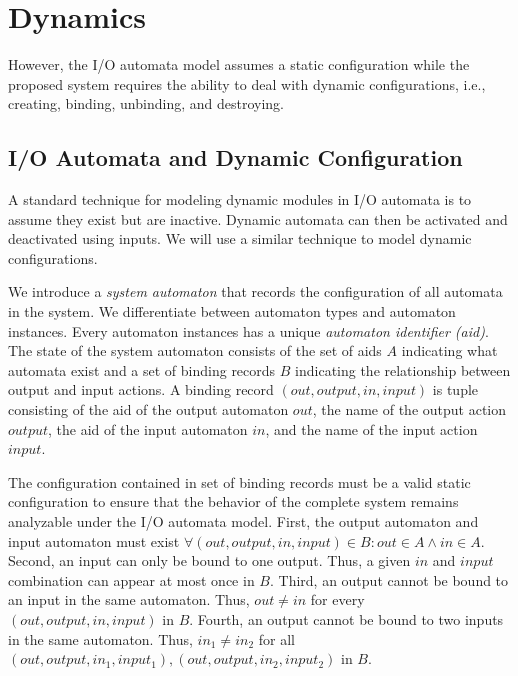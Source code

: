 \section{Dynamics}

However, the I/O automata model assumes a static configuration while the proposed system requires the ability to deal with dynamic configurations, i.e., creating, binding, unbinding, and destroying.

\subsection{I/O Automata and Dynamic Configuration}

A standard technique for modeling dynamic modules in I/O automata is to assume they exist but are inactive.
Dynamic automata can then be activated and deactivated using inputs.
We will use a similar technique to model dynamic configurations.

We introduce a \emph{system automaton} that records the configuration of all automata in the system.
We differentiate between automaton types and automaton instances.
Every automaton instances has a unique \emph{automaton identifier (aid)}.
The state of the system automaton consists of the set of aids $A$ indicating what automata exist and a set of binding records $B$ indicating the relationship between output and input actions.
A binding record $(out, output, in, input)$ is tuple consisting of the aid of the output automaton $out$, the name of the output action $output$, the aid of the input automaton $in$, and the name of the input action $input$.

The configuration contained in set of binding records must be a valid static configuration to ensure that the behavior of the complete system remains analyzable under the I/O automata model.
First, the output automaton and input automaton must exist $\forall (out, output, in, input) \in B: out \in A \land in \in A$.
Second, an input can only be bound to one output.
Thus, a given $in$ and $input$ combination can appear at most once in $B$.
Third, an output cannot be bound to an input in the same automaton.
Thus, $out \neq in$ for every $(out, output, in, input)$ in $B$.
Fourth, an output cannot be bound to two inputs in the same automaton.
Thus, $in_1 \neq in_2$ for all $(out, output, in_1, input_1), (out, output, in_2, input_2)$ in $B$.

